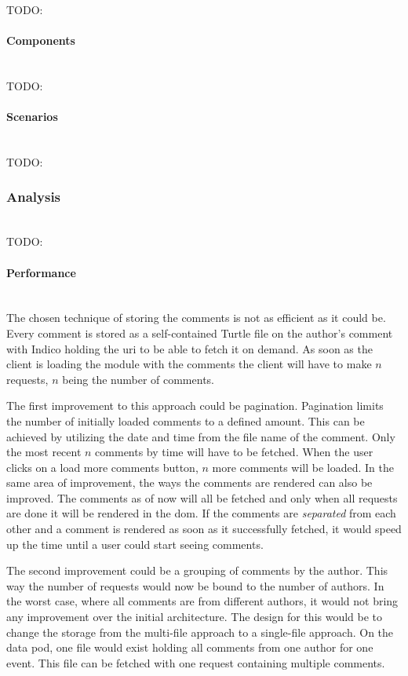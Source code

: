 TODO:
\vspace{0.5cm}
\paragraph{Components}\mbox{}\\

TODO:
\vspace{0.5cm}
\paragraph{Scenarios}\mbox{}\\

TODO:
\subsubsection{Analysis}\mbox{}\\

TODO:
\vspace{0.5cm}
\paragraph{Performance}\mbox{}\\

The chosen technique of storing the comments is not as efficient as it could be. Every comment is stored as a self-contained Turtle file on the author's comment with Indico holding the \gls{uri} to be able to fetch it on demand. As soon as the client is loading the module with the comments the client will have to make $n$ requests, $n$ being the number of comments.

The first improvement to this approach could be pagination. Pagination limits the number of initially loaded comments to a defined amount. This can be achieved by utilizing the date and time from the file name of the comment. Only the most recent $n$ comments by time will have to be fetched. When the user clicks on a load more comments button, $n$ more comments will be loaded.
In the same area of improvement, the ways the comments are rendered can also be improved. The comments as of now will all be fetched and only when all requests are done it will be rendered in the \gls{dom}. If the comments are \textit{separated} from each other and a comment is rendered as soon as it successfully fetched, it would speed up the time until a user could start seeing comments.

The second improvement could be a grouping of comments by the author. This way the number of requests would now be bound to the number of authors. In the worst case, where all comments are from different authors, it would not bring any improvement over the initial architecture. The design for this would be to change the storage from the multi-file approach to a single-file approach. On the data pod, one file would exist holding all comments from one author for one event. This file can be fetched with one request containing multiple comments.

